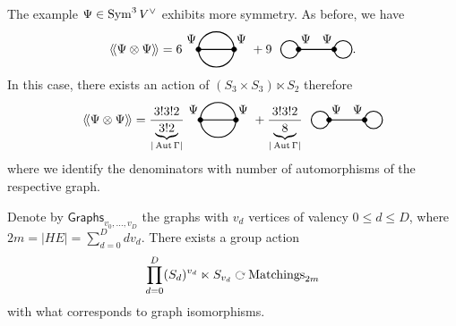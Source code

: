 \begin{example}
  The example $\Psi \in \operatorname{Sym}^3 V^\vee$ exhibits more symmetry. As before, we have
  \begin{equation*}
    \avg{\Psi \otimes \Psi}
    = 6
    \begin{tikzpicture}[baseline=-1mm]
      \draw[thick] (0, 0) node at (-0.2, 0.3) {$\Psi$} -- (1, 0) node at (1.2, 0.3) {$\Psi$};
      \draw[thick] (0, 0) arc (180:0:.5);
      \draw[thick] (0, 0) arc (-180:0:.5);
      \draw[fill=black] (0, 0) circle (2pt);
      \draw[fill=black] (1, 0) circle (2pt);
    \end{tikzpicture}
    + 9 \ \
    \begin{tikzpicture}[baseline=-1mm]
      \draw[thick] (0, 0) node at (0.2, 0.3) {$\Psi$} -- (1, 0) node at (0.8, .3) {$\Psi$};
      \draw[thick] (-.25, 0) circle (2.5mm);
      \draw[thick] (1.25, 0) circle (2.5mm);
      \draw[fill=black] (0, 0) circle (2pt);
      \draw[fill=black] (1, 0) circle (2pt);
    \end{tikzpicture}.
  \end{equation*}
  In this case, there exists an action of $(S_3 \times S_3) \ltimes S_2$ therefore
  \begin{equation*}
    \avg{\Psi \otimes \Psi}
    = \frac{3! 3! 2}{\underbrace{3! 2}_{| \Aut \Gamma |}}
    \begin{tikzpicture}[baseline=-1mm]
      \draw[thick] (0, 0) node at (-0.2, 0.3) {$\Psi$} -- (1, 0) node at (1.2, 0.3) {$\Psi$};
      \draw[thick] (0, 0) arc (180:0:.5);
      \draw[thick] (0, 0) arc (-180:0:.5);
      \draw[fill=black] (0, 0) circle (2pt);
      \draw[fill=black] (1, 0) circle (2pt);
    \end{tikzpicture}
    + \frac{3! 3! 2}{\underbrace{8}_{|\Aut \Gamma|}} \ \
    \begin{tikzpicture}[baseline=-1mm]
      \draw[thick] (0, 0) node at (0.2, 0.3) {$\Psi$} -- (1, 0) node at (0.8, .3) {$\Psi$};
      \draw[thick] (-.25, 0) circle (2.5mm);
      \draw[thick] (1.25, 0) circle (2.5mm);
      \draw[fill=black] (0, 0) circle (2pt);
      \draw[fill=black] (1, 0) circle (2pt);
    \end{tikzpicture}
  \end{equation*}
  where we identify the denominators with number of automorphisms of the respective graph.
\end{example}

Denote by $\mathsf{Graphs}_{v_0, \dots, v_D}$ the graphs with $v_d$ vertices of valency $0 \leq d \leq D$, where $2m = |HE| = \sum_{d = 0}^D d {v_d}$. There exists a group action
\begin{equation*}
  \prod_{d = 0}^D (S_d)^{v_d} \ltimes S_{v_d} \acts \text{Matchings}_{2m}
\end{equation*}
with what corresponds to graph isomorphisms.
